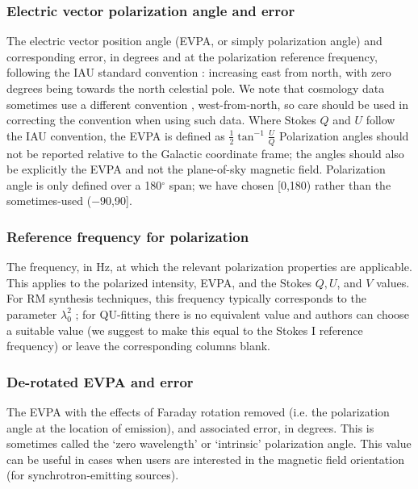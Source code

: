 \documentclass[10pt,modern]{aastex63}
\begin{document}
\subsubsection{Electric vector polarization angle and error}
The electric vector position angle (EVPA, or simply polarization angle) and corresponding error, in degrees and at the polarization reference frequency, following the IAU standard convention \citep{IAU-polangle}: increasing east from north, with zero degrees being towards the north celestial pole. We note that cosmology data sometimes use a different convention \citep{deSeregoAlighieri2017}, west-from-north, so care should be used in correcting the convention when using such data. Where Stokes $Q$ and $U$ follow the IAU convention, the EVPA is defined as $\frac{1}{2}\tan^{-1}\frac{U}{Q}$ Polarization angles should not be reported relative to the Galactic coordinate frame; the angles should also be explicitly the EVPA and not the plane-of-sky magnetic field. Polarization angle is only defined over a 180$^\circ$ span; we have chosen [0\degr,180\degr) rather than the sometimes-used ($-90$\degr,90\degr].

\subsubsection{Reference frequency for polarization}
The frequency, in Hz, at which the relevant polarization properties are applicable. This applies to the polarized intensity, EVPA, and the Stokes $Q,U$, and $V$ values. For RM synthesis techniques, this frequency typically corresponds to the parameter $\lambda^2_0$ \citep{Brentjens2005}; for QU-fitting there is no equivalent value and authors can choose a suitable value (we suggest to make this equal to the Stokes I reference frequency) or leave the corresponding columns blank.

\subsubsection{De-rotated EVPA and error}
The EVPA with the effects of Faraday rotation removed (i.e. the polarization angle at the location of emission), and associated error, in degrees. This is sometimes called the `zero wavelength' or `intrinsic' polarization angle. This value can be useful in cases when users are interested in the magnetic field orientation (for synchrotron-emitting sources).
\end{document}
